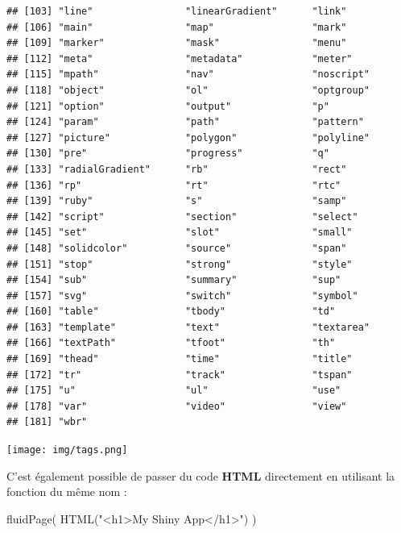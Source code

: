 \documentclass[
]{article}
\newenvironment{Shaded}{\begin{snugshade}}{\end{snugshade}}
\newcommand{\FunctionTok}[1]{\textcolor[rgb]{0.00,0.00,0.00}{#1}}
\newcommand{\NormalTok}[1]{#1}
\newcommand{\StringTok}[1]{\textcolor[rgb]{0.31,0.60,0.02}{#1}}
\begin{document}
\begin{verbatim}
## [103] "line"                "linearGradient"      "link"               
## [106] "main"                "map"                 "mark"               
## [109] "marker"              "mask"                "menu"               
## [112] "meta"                "metadata"            "meter"              
## [115] "mpath"               "nav"                 "noscript"           
## [118] "object"              "ol"                  "optgroup"           
## [121] "option"              "output"              "p"                  
## [124] "param"               "path"                "pattern"            
## [127] "picture"             "polygon"             "polyline"           
## [130] "pre"                 "progress"            "q"                  
## [133] "radialGradient"      "rb"                  "rect"               
## [136] "rp"                  "rt"                  "rtc"                
## [139] "ruby"                "s"                   "samp"               
## [142] "script"              "section"             "select"             
## [145] "set"                 "slot"                "small"              
## [148] "solidcolor"          "source"              "span"               
## [151] "stop"                "strong"              "style"              
## [154] "sub"                 "summary"             "sup"                
## [157] "svg"                 "switch"              "symbol"             
## [160] "table"               "tbody"               "td"                 
## [163] "template"            "text"                "textarea"           
## [166] "textPath"            "tfoot"               "th"                 
## [169] "thead"               "time"                "title"              
## [172] "tr"                  "track"               "tspan"              
## [175] "u"                   "ul"                  "use"                
## [178] "var"                 "video"               "view"               
## [181] "wbr"
\end{verbatim}

\texttt{[image: img/tags.png]}

C'est également possible de passer du code \textbf{HTML} directement en
utilisant la fonction du même nom :

\begin{Shaded}
\begin{Highlighting}[]
\FunctionTok{fluidPage}\NormalTok{(}
  \FunctionTok{HTML}\NormalTok{(}\StringTok{"\textless{}h1\textgreater{}My Shiny App\textless{}/h1\textgreater{}"}\NormalTok{) }
\NormalTok{)}
\end{Highlighting}
\end{Shaded}
\end{document}
